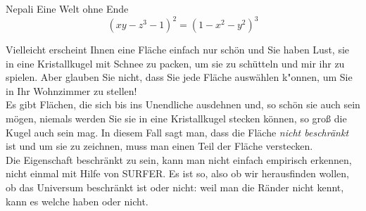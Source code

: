 \begin{surferPage}{Nepali}
Eine Welt ohne Ende\\

\smallskip
\[(x y - z^3 -1)^2= (1 - x^2	- y^2)^3\]

\singlespacing
Vielleicht erscheint Ihnen eine Fläche einfach nur schön und Sie haben Lust, sie in eine Kristallkugel mit Schnee zu packen, um sie zu schütteln und mir ihr zu spielen. Aber glauben Sie nicht, dass Sie jede Fläche auswählen k"onnen, um Sie in Ihr Wohnzimmer zu stellen!\\
\singlespacing
Es gibt Flächen, die sich bis ins Unendliche ausdehnen und, so schön sie auch sein mögen, niemals werden Sie sie in eine Kristallkugel stecken können, so groß die Kugel auch sein mag. In diesem Fall sagt man, dass die Fläche \textit{nicht beschränkt} ist und um sie zu zeichnen, muss man einen Teil der Fläche verstecken.\\
\singlespacing
Die Eigenschaft beschränkt zu sein, kann man nicht einfach empirisch erkennen, nicht einmal mit Hilfe von SURFER. Es ist so, also ob wir herausfinden wollen, ob das Universum beschränkt ist oder nicht: weil man die Ränder nicht kennt, kann es welche haben oder nicht.
\end{surferPage}
